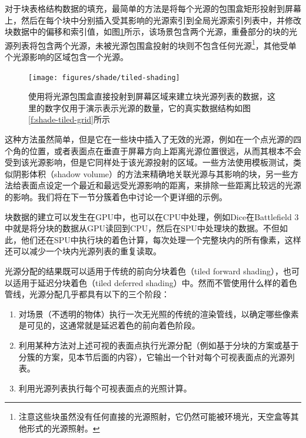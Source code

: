对于块表格结构数据的填充，最简单的方法是将每个光源的包围盒矩形投射到屏幕上，然后在每个块中分别插入受其影响的光源索引到全局光源索引列表中，并修改块数据中的偏移和索引值，如图\ref{f:shade-tiled-shading}所示，该场景包含两个光源，重叠部分的块的光源列表将包含两个光源，未被光源包围盒投射的块则不包含任何光源\footnote{注意这些块虽然没有任何直接的光源照射，它仍然可能被环境光，天空盒等其他形式的光源照射。}，其他受单个光源影响的区域包含一个光源。

\begin{figure}
	\texttt{[image: figures/shade/tiled-shading]}
	\caption{使用将光源包围盒直接投射到屏幕区域来建立块光源列表的数据，这里的数字仅用于演示表示光源的数量，它的真实数据结构如图\ref{f:shade-tiled-grid}所示}
	\label{f:shade-tiled-shading}
\end{figure}

这种方法虽然简单，但是它在一些块中插入了无效的光源，例如在一个点光源的四个角的位置，或者表面点在垂直于屏幕方向上距离光源位置很远，从而其根本不会受到该光源影响，但是它同样处于该光源投射的区域。一些方法使用模板测试，类似阴影体积（shadow volume）的方法来精确地关联光源与其影响的块，另一些方法给表面点设定一个最近和最远受光源影响的距离，来排除一些距离比较远的光源的影响。我们将在下一节分簇着色中讨论一个更详细的示例。

块数据的建立可以发生在GPU中，也可以在CPU中处理，例如Dice在Battlefield 3\cite{a:SPU-basedDeferredShadingforBattlefield3onPlaystation3}中就是将分块的数据从GPU读回到CPU，然后在SPU中处理块的数据。不但如此，他们还在SPU中执行块的着色计算，每次处理一个完整块内的所有像素，这样还可以减少一个块内光源列表的重复读取。


光源分配的结果既可以适用于传统的前向分块着色\cite{a:ForwardBringingDeferredLightingtotheNextLevel}（tiled forward shading），也可以适用于延迟分块着色（tiled deferred shading）中。然而不管使用什么样的着色管线，光源分配几乎都具有以下的三个阶段：

\begin{enumerate}
	\item 对场景（不透明的物体）执行一次无光照的传统的渲染管线，以确定哪些像素是可见的，这通常就是延迟着色的前向着色阶段。
	\item 利用某种方法对上述可视的表面点执行光源分配（例如基于分块的方案或基于分簇的方案，见本节后面的内容），它输出一个针对每个可视表面点的光源列表。
	\item 利用光源列表执行每个可视表面点的光照计算。
\end{enumerate}

